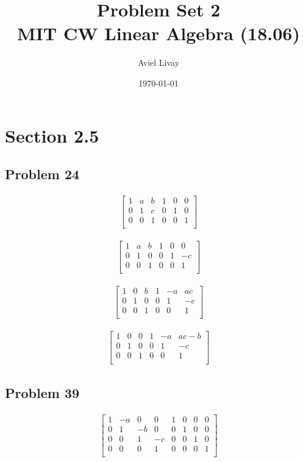 \documentclass[a4paper,11pt]{article}
\title{%
	Problem Set 2\\
	\large MIT CW Linear Algebra (18.06)
}
\author{Aviel Livay}
\date{\today}
\begin{document}
\maketitle


\section*{Section 2.5}
\subsection*{Problem 24}
\begin{align}
\left[
\begin{array}{ccc|ccc}
1 & a & b & 1 & 0 & 0 \\
0 & 1 & c & 0 & 1 & 0\\
0 & 0 & 1 & 0 & 0 & 1\\
\end{array}
\right]
\end{align}

\begin{align}
\left[
\begin{array}{ccc|ccc}
1 & a & b & 1 & 0 & 0 \\
0 & 1 & 0 & 0 & 1 & -c\\
0 & 0 & 1 & 0 & 0 & 1\\
\end{array}
\right]
\end{align}

\begin{align}
\left[
\begin{array}{ccc|ccc}
1 & 0 & b & 1 & -a & ac \\
0 & 1 & 0 & 0 & 1 & -c\\
0 & 0 & 1 & 0 & 0 & 1\\
\end{array}
\right]
\end{align}

\begin{align}
\left[
\begin{array}{ccc|ccc}
1 & 0 & 0 & 1 & -a & ac-b \\
0 & 1 & 0 & 0 & 1 & -c\\
0 & 0 & 1 & 0 & 0 & 1\\
\end{array}
\right]
\end{align}

\subsection*{Problem 39}
\begin{align}
\left[
\begin{array}{cccc|cccc}
1 & -a & 0 & 0 & 1 & 0 & 0 & 0 \\
0 & 1 & -b & 0 & 0 & 1 & 0 & 0\\
0 & 0 & 1 & -c & 0 & 0 & 1 & 0\\
0 & 0 & 0 & 1 & 0 & 0 & 0 & 1\\
\end{array}
\right]
\end{align}
\end{document}

